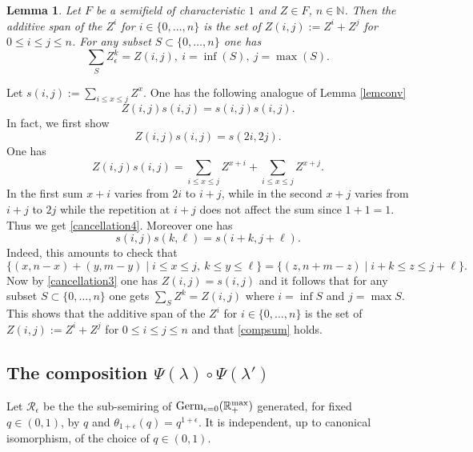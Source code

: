 \documentclass[noams,lp]{compositio}
\newtheorem{lem}[thm]{Lemma}
\def\N{{\mathbb N}}
\def\R{{\mathbb R}}
\def\cR{{\mathcal R}}
\def\rmax{\R_+^{\rm max}}
\def\beps{{\cR_\epsilon}}
\def\germ{{{\rm Germ}_{\epsilon=0}(\rmax)}}
\begin{document}
\begin{lem}\label{span} Let $F$ be a semifield of characteristic $1$ and $Z\in F$, $n\in \N$. Then the additive span of the $Z^i$ for $i\in \{0,\ldots, n\}$ is the set of $Z(i,j):=Z^i+Z^j$ for $0\leq i\leq j\leq n$.\newline
 For any subset $S\subset \{0,\ldots,n\}$ one has
\begin{equation}\label{compsum}
\sum_S Z_\epsilon^k=Z(i,j), \  i=\inf(S), \  j=\max(S).
\end{equation}
\end{lem}
\proof 
Let $s(i,j):=\sum_{i\leq x\leq j} Z^x$. One has the following analogue of Lemma \ref{lemconv}
\begin{equation}\label{cancellation3}
Z(i,j)s(i,j)=s(i,j)s(i,j).
\end{equation}
In fact, we first show
\begin{equation}\label{cancellation4}
Z(i,j)s(i,j)=s(2i,2j).
\end{equation}
One has
$$
Z(i,j)s(i,j)=\sum_{i\leq x\leq j} Z^{x+i}+\sum_{i\leq x\leq j} Z^{x+j}.
$$
In the first sum $x+i$ varies from $2i$ to $i+j$, while in the second $x+j$ varies from $i+j$ to $2j$ while the repetition at $i+j$ does not affect the sum since $1+1=1$. Thus we get \eqref{cancellation4}. Moreover one has 
\begin{equation}\label{cancellation5}
s(i,j)s(k,\ell)=s(i+k,j+\ell).
\end{equation}
Indeed, this amounts to check that 
$$
\{(x,n-x)+(y,m-y)\mid i\leq x\leq j, \  k\leq y\leq \ell\}=\{(z,n+m-z)\mid i+k\leq z\leq j+\ell\}.
$$
Now by \eqref{cancellation3} one has $Z(i,j)=s(i,j)$ and it follows that for any subset $S\subset \{0,\ldots, n\}$ one gets $\sum_S Z^k=Z(i,j)$ where $i=\inf S$ and $j=\max S$. This shows that the additive span of the $Z^i$ for $i\in \{0,\ldots, n\}$ is the set of $Z(i,j):=Z^i+Z^j$ for $0\leq i\leq j\leq n$ and that \eqref{compsum} holds.\endproof

\subsection{The composition $\Psi(\lambda)\circ \Psi(\lambda')$}

Let $\beps$ be the the sub-semiring of  $\germ$ generated, for fixed $q\in (0,1)$, by $q$ and $\theta_{1+\epsilon}(q)=q^{1+\epsilon}$. It is independent, up to canonical isomorphism, of the choice of $q\in (0,1)$.
\end{document}
